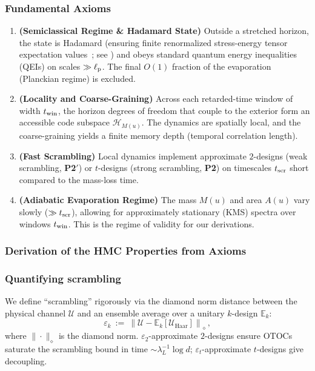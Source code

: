 \documentclass[11pt,a4paper]{article}
\newcommand{\Ptwo}{\textbf{P2}\xspace}
\newcommand{\PtwoPrime}{\textbf{P2$'$}\xspace}
\newcommand{\HMC}{\textsc{HMC}\xspace}
\theoremstyle{plain}
\theoremstyle{definition}
\theoremstyle{remark}
\begin{document}
\subsubsection{Fundamental Axioms}
\begin{enumerate}[label=\textbf{Axiom \arabic*}:]
  \item \textbf{(Semiclassical Regime \& Hadamard State)} Outside a stretched horizon, the state is Hadamard (ensuring finite renormalized stress-energy tensor expectation values~\cite{Radzikowski:1996}; see ) and obeys standard quantum energy inequalities (QEIs) on scales \(\gg \ell_{\rm p}\).
The final \(O(1)\) fraction of the evaporation (Planckian regime) is excluded.
  \item \textbf{(Locality and Coarse-Graining)} Across each retarded-time window of width $t_{\rm win}$, the horizon degrees of freedom that couple to the exterior form an accessible code subspace $\mathcal{H}_{M(u)}$. The dynamics are spatially local, and the coarse-graining yields a finite memory depth (temporal correlation length).
  \item \textbf{(Fast Scrambling)} Local dynamics implement approximate \(2\)-designs (weak scrambling, \PtwoPrime) or \(t\)-designs (strong scrambling, \Ptwo) on timescales \(t_{\rm scr}\) short compared to the mass-loss time.
  \item \textbf{(Adiabatic Evaporation Regime)} The mass \(M(u)\) and area \(A(u)\) vary slowly (\(\gg t_{\rm scr}\)), allowing for approximately stationary (KMS) spectra over windows \(t_{\rm win}\). This is the regime of validity for our derivations.
\end{enumerate}

\subsubsection{Derivation of the \HMC{} Properties from Axioms}

\subsubsection{Quantifying scrambling}
We define ``scrambling'' rigorously via the diamond norm distance between the physical channel $\mathcal{U}$ and an ensemble average over a unitary $k$-design $\mathbb{E}_k$:
\begin{equation}
\varepsilon_k \ :=\ \left\|\mathcal{U} - \mathbb{E}_k[\mathcal{U}_{\text{Haar}}]\right\|_{\diamond}\,,
\end{equation}
where $\|\cdot\|_{\diamond}$ is the diamond norm. $\varepsilon_2$-approximate $2$-designs ensure OTOCs saturate the scrambling bound in time $\sim \lambda_L^{-1}\log d$; $\varepsilon_t$-approximate $t$-designs give decoupling.
\end{document}
